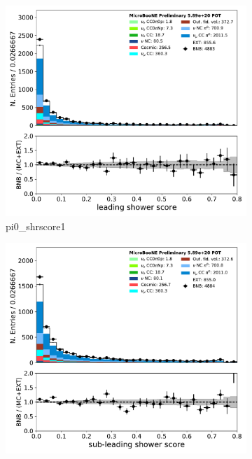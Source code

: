\begin{figure}[H] 
\begin{center}
    \begin{subfigure}[b]{0.3\textwidth}
    \centering
    \includegraphics[width=1.00\textwidth]{pi0/inputs/pi0_shrscore1_03182020_presel.pdf}
    \caption{\label{fig:pi0:inputs:shrscore1:RUN1} pi0\_shrscore1}
    \end{subfigure}
    \begin{subfigure}[b]{0.3\textwidth}
    \centering
    \includegraphics[width=1.00\textwidth]{pi0/inputs/pi0_shrscore2_03182020_presel.pdf}

\end{subfigure}
\end{center}
\end{figure}
